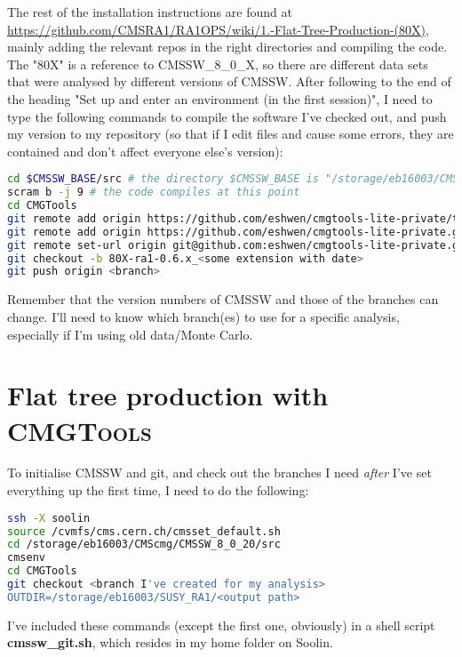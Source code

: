 The rest of the installation instructions are found at \url{https://github.com/CMSRA1/RA1OPS/wiki/1.-Flat-Tree-Production-(80X)}, mainly adding the relevant repos in the right directories and compiling the code. The "80X" is a reference to CMSSW\_8\_0\_X, so there are different data sets that were analysed by different versions of CMSSW. After following to the end of the heading "Set up and enter an environment (in the first session)", I need to type the following commands to compile the software I've checked out, and push my version to my repository (so that if I edit files and cause some errors, they are contained and don't affect everyone else's version):

\begin{lstlisting}[belowskip=-0.7cm, language=sh, numbers=none]
cd $CMSSW_BASE/src # the directory $CMSSW_BASE is "/storage/eb16003/CMScmg/CMSSW_8_0_20/" and is initialised at the command "cmsenv"
scram b -j 9 # the code compiles at this point
cd CMGTools
git remote add origin https://github.com/eshwen/cmgtools-lite-private/tree/80X-ra1-0.6.x/RA1
git remote add origin https://github.com/eshwen/cmgtools-lite-private.git
git remote set-url origin git@github.com:eshwen/cmgtools-lite-private.git
git checkout -b 80X-ra1-0.6.x_<some extension with date>
git push origin <branch>
\end{lstlisting}

Remember that the version numbers of CMSSW and those of the branches can change. I'll need to know which branch(es) to use for a specific analysis, especially if I'm using old data/Monte Carlo.

\section{Flat tree production with \textsc{CMGTools}}
\label{subsec:flattreeprodCMG}

To initialise CMSSW and git, and check out the branches I need \emph{after} I've set everything up the first time, I need to do the following:

\begin{lstlisting}[belowskip=-0.7cm, language=sh, numbers=none]
ssh -X soolin
source /cvmfs/cms.cern.ch/cmsset_default.sh
cd /storage/eb16003/CMScmg/CMSSW_8_0_20/src
cmsenv
cd CMGTools
git checkout <branch I've created for my analysis>
OUTDIR=/storage/eb16003/SUSY_RA1/<output path>
\end{lstlisting}

I've included these commands (except the first one, obviously) in a shell script \textbf{cmssw\_git.sh}, which resides in my home folder on Soolin.

